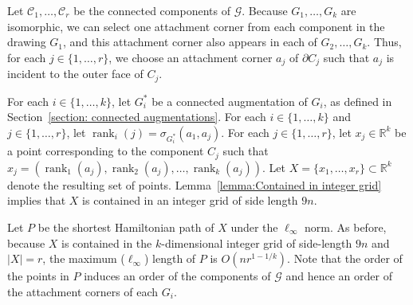 \documentclass[11pt]{patmorin}
\DeclareMathOperator{\rank}{rank}
\newcommand{\R}{\mathbb{R}}
\begin{document}
Let $\mathcal C_1, \ldots, \mathcal C_r$ be the connected components of $\mathcal G$.  Because $G_1,\ldots,G_k$ are isomorphic, we can select one attachment corner from each component in the drawing $G_1$, and this attachment corner also appears in each of $G_2,\ldots,G_k$. Thus, for each $j\in\{1,\ldots,r\}$, we choose an attachment corner $a_j$ of $\partial C_j$ such that $a_j$ is incident to the outer face of $C_j$.

For each $i\in \{1,\dots,k\}$, let $G_i^*$ be a connected augmentation of $G_i$, as defined in Section~\ref{section: connected augmentations}. For each $i\in\{1,\ldots,k\}$ and $j\in\{1,\ldots,r\}$, let $\rank_i(j) = \sigma_{G_i^*}(a_1, a_j)$. For each $j\in\{1,\ldots,r\}$, let $x_j\in \mathbb{R}^k$ be a point corresponding to the component $C_j$ such that $x_j = (\rank_1(a_j), \rank_2(a_j), \ldots, \rank_k(a_j))$. Let $X = \{x_1, \ldots, x_r\}\subset\R^k$ denote the resulting set of points. Lemma~\ref{lemma:Contained in integer grid} implies that $X$ is contained in an integer grid of side length $9n$.

Let $P$ be the shortest Hamiltonian path of $X$ under the $\ell_\infty$ norm. As before, because $X$ is contained in the $k$-dimensional integer grid of side-length $9n$ and $|X| = r$, the maximum ($\ell_\infty$) length of $P$ is $O(nr^{1-1/k})$. Note that the order of the points in $P$ induces an order of the components of $\mathcal G$ and hence an order of the attachment corners of each $G_i$.
\end{document}
